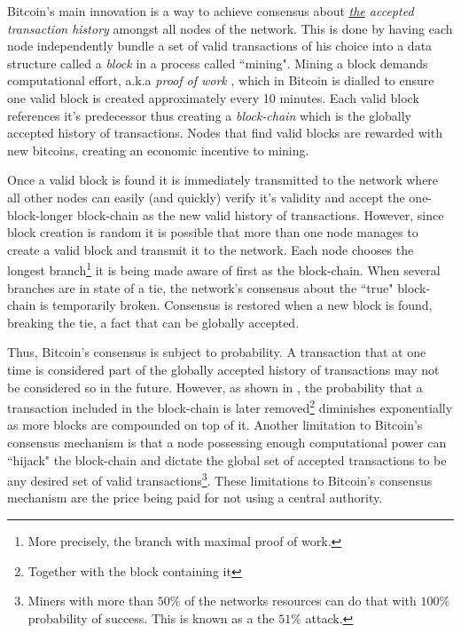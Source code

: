\documentclass[letterpaper,12pt]{report}
\theoremstyle{plain}
\theoremstyle{definition}
\begin{document}
Bitcoin's main innovation is a way to achieve consensus about \emph{\underline{the} accepted transaction history} amongst all nodes of the network. This is done by having each node independently bundle a set of valid transactions of his choice into a data structure called a \textit{block} in a process called ``mining". Mining a block demands computational effort, a.k.a \textit{proof of work} \cite{hashcash}, which in Bitcoin is dialled to ensure one valid block is created approximately every 10 minutes. Each valid block references it's predecessor thus creating a \textit{block-chain} which is the globally accepted history of transactions. Nodes that find valid blocks are rewarded with new bitcoins, creating an economic incentive to mining.

Once a valid block is found it is immediately transmitted to the network where all other nodes can easily (and quickly) verify it's validity and accept the one-block-longer block-chain as the new valid history of transactions. However, since block creation is random it is possible that more than one node manages to create a valid block and transmit it to the network. Each node chooses the longest branch\footnote{More precisely, the branch with maximal proof of work.} it is being made aware of first as the block-chain. When several branches are in state of a tie, the network's consensus about the ``true" block-chain is temporarily broken. Consensus is restored when a new block is found, breaking the tie, a fact that can be globally accepted. 

Thus, Bitcoin's consensus is subject to probability. A transaction that at one time is considered part of the globally accepted history of transactions may not be considered so in the future. However, as shown in \cite{Bitcoin}, the probability that a transaction included in the block-chain is later removed\footnote{Together with the block containing it} diminishes exponentially as more blocks are compounded on top of it. Another limitation to Bitcoin's consensus mechanism is that a node possessing enough computational power can ``hijack" the block-chain and dictate the global set of accepted transactions to be any desired set of valid transactions\footnote{Miners with more than $50\%$ of the networks resources can do that with $100\%$ probability of success. This is known as a the $51\%$ attack.}. These limitations to Bitcoin's consensus mechanism are the price being paid for not using a central authority. 
\end{document}
